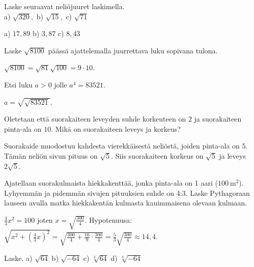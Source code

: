 \begin{tehtavasivu}

\begin{tehtava}
Laske seuraavat neliöjuuret laskimella.\\
a) $\sqrt{320}$,\ b) $\sqrt{15}$,\ c) $\sqrt{71}$
\begin{vastaus}
a) $17{,}89$ b) $3{,}87$ c) $8{,}43$
\end{vastaus}
\end{tehtava}


\begin{tehtava}
Laske $\sqrt{8100}$ päässä ajattelemalla juurrettava luku sopivana tulona.
\begin{vastaus}
$\sqrt{8100}=\sqrt{81}\sqrt{100}=9\cdot 10$.
\end{vastaus}
\end{tehtava}


\begin{tehtava}
Etsi luku $a>0$ jolle $a^4=83521$.
\begin{vastaus}
$a=\sqrt{\sqrt{83521}}$.
\end{vastaus}
\end{tehtava}


\begin{tehtava}
Oletetaan että suorakaiteen leveyden suhde korkeuteen on $2$ ja suorakaiteen pinta-ala on $10$. Mikä on suorakaiteen 
leveys ja korkeus?
\begin{vastaus}
Suorakaide muodostuu kahdesta vierekkäisestä neliöstä, joiden pinta-ala on $5$. Tämän neliön sivun pituus on $\sqrt{5}$.
Siis suorakaiteen korkeus on $\sqrt{5}$ ja leveys $2\sqrt{5}$.
\end{vastaus}
\end{tehtava}


\begin{tehtava}
Ajatellaan suorakulmaista hiekkakenttää, jonka pinta-ala on 1 aari ($100~\mathrm{m}^2$). Lyhyemmän ja pidemmän sivujen 
pituuksien suhde on 4:3. Laske Pythagoraan lauseen avulla matka hiekkakentän kulmasta kauimmaisena olevaan kulmaan.
\begin{vastaus}
$\frac{4}{3}x^2=100$ joten $x = \sqrt{\frac{300}{4}}$. 
Hypotenuusa: $\sqrt{x^2 + (\frac{4}{3}x)^2}=\sqrt{\frac{300}{4}+\frac{16}{9}\cdot \frac{300}{4}}
=\frac{5}{3}\sqrt{\frac{300}{4}}\approx 14{,}4$.
\end{vastaus}
\end{tehtava}


\begin{tehtava}
Laske.
a) $\sqrt{64}$ \quad b) $\sqrt{-64}$ \quad c) $\sqrt[3]{64}$ \quad d) $\sqrt[3]{-64}$


\end{tehtava}
\end{tehtavasivu}
